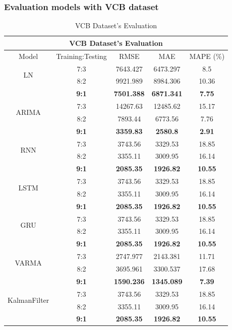 \subsubsection{Evaluation models with VCB dataset}
\begin{table}[H]
    \centering
    \caption{VCB Dataset's Evaluation}
    \begin{tabular}{|c|c|c|c|c|}
         \hline
         \multicolumn{5}{|c|}{\textbf{VCB Dataset's Evaluation}}\\
         \hline
         \centering Model & Training:Testing & RMSE & MAE & MAPE (\%)\\
         \hline
         \multirow{2}{*}{LN} & 7:3 & 7643.427&6473.297&8.5 \\ & 8:2 & 9921.989&8984.306&10.36 \\ & \textbf{9:1} & \textbf{7501.388} & \textbf{6871.341} & \textbf{7.75}\\
         \hline
         \multirow{2}{*}{ARIMA} & 7:3 & 14267.63&12485.62&15.17\\ & 8:2 & 7893.44&6773.56&7.76 \\ & \textbf{9:1} & \textbf{3359.83} & \textbf{2580.8} & \textbf{2.91}\\
         \hline
         \multirow{2}{*}{RNN} & 7:3 & 3743.56&3329.53&18.85\\ & 8:2 & 3355.11&3009.95&16.14 \\ & \textbf{9:1} & \textbf{2085.35} & \textbf{1926.82} & \textbf{10.55}\\
         \hline
         \multirow{2}{*}{LSTM} & 7:3 & 3743.56&3329.53&18.85\\ & 8:2 & 3355.11&3009.95&16.14 \\ & \textbf{9:1} & \textbf{2085.35} & \textbf{1926.82} & \textbf{10.55}\\
         \hline
         \multirow{2}{*}{GRU} & 7:3 & 3743.56&3329.53&18.85\\ & 8:2 & 3355.11&3009.95&16.14 \\ & \textbf{9:1} & \textbf{2085.35} & \textbf{1926.82} & \textbf{10.55}\\
         \hline
         \multirow{2}{*}{VARMA} & 7:3 & 2747.977&2143.381&11.71\\ & 8:2 & 3695.961&3300.537&17.68 \\ & \textbf{9:1} & \textbf{1590.236} & \textbf{1345.089} & \textbf{7.39}\\       
         \hline
         \multirow{2}{*}{KalmanFilter} & 7:3 & 3743.56&3329.53&18.85\\ & 8:2 & 3355.11&3009.95&16.14 \\ & \textbf{9:1} & \textbf{2085.35} & \textbf{1926.82} & \textbf{10.55}\\

\end{tabular}
\end{table}
